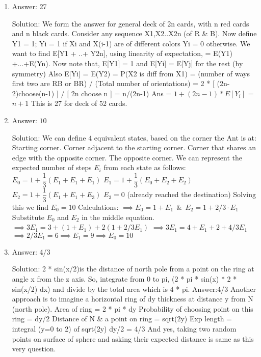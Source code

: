 \begin{enumerate}

\item
Answer: 27
 
Solution: We form the answer for general deck of 2n cards, with n red cards and n black cards. Consider any sequence X1,X2..X2n (of R \& B). Now define  Y1 = 1;
Yi = 1 if Xi and X(i-1) are of different colors
Yi = 0 otherwise.
We want to find E[Y1 + ..+ Y2n], using linearity of expectation, = E(Y1) +...+E(Yn). Now note that, E[Y1] = 1 and E[Yi] = E[Yj] for the rest (by symmetry)
Also E[Yi] = E(Y2) = P(X2 is diff from X1) =  (number of ways first two are RB or BR) / (Total number of orientations) = 2 * [ (2n-2)choose(n-1) ] / [ 2n choose n ] = n/(2n-1)
Ans = $1+(2n-1) * E[Y_i]$ = $n+1$
This is 27 for deck of 52 cards.




\item
Answer: $10$
 
Solution: We can define $4$ equivalent states, based on the corner the Ant is at:
Starting corner.
Corner adjacent to the starting corner.
Corner that shares an edge with the opposite corner.
The opposite corner.
We can represent the expected number of steps $E_i$ from each state as follows:
$E_0 = 1 + \dfrac{1}{3}(E_1 + E_1 + E_1)$
$E_1 = 1 + \dfrac{1}{3} (E_0 + E_2 + E_2)$
$E_2 = 1 + \dfrac{1}{3}(E_1 + E_1 + E_3)$
$E_3 = 0$ (already reached the destination)
Solving this we find $E_0 = 10$
Calculations:
$\implies E_0 = 1 + E_1  ~~\&~~ E_2 = 1 + 2/3 \cdot E_1$
Substitute $E_0$ and $E_2$ in the middle equation.
$\implies 3E_1 = 3 + (1 + E_1) + 2 (1 + 2/3 E_1)$
$\implies 3E_1 = 4 + E_1 + 2 + 4/3 E_1$
$\implies 2/3 E_1 = 6 \implies E_1=9 \implies E_0 = 10$




\item
Answer: 4/3
 
Solution: 2 * sin(x/2)is the distance of north pole from a point on the ring at angle x from the z axis. So, integrate from 0 to pi, (2 * pi * sin(x) * 2 * sin(x/2) dx) and divide by the total area which is 4 * pi.
Answer:4/3
Another approach is to imagine a horizontal ring of dy thickness at distance y from N (north pole).
Area of ring = 2 * pi * dy
Probability of choosing point on this ring = dy/2
Distance of N \& a point on ring = sqrt(2y)
Exp length = integral (y=0 to 2) of sqrt(2y) dy/2 = 4/3
And yes, taking two random points on surface of sphere and asking their expected distance is same as this very question.




\end{enumerate}
